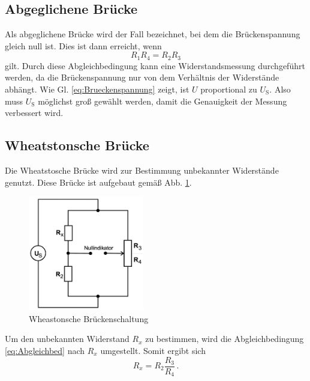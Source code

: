     \subsection{Abgeglichene Brücke}
    Als abgeglichene Brücke wird der Fall bezeichnet, bei dem die Brückenspannung gleich null ist.
    Dies ist dann erreicht, wenn
    \begin{equation}
        R_1 R_4 = R_2 R_3
        \label{eq:Abgleichbed}
    \end{equation}
    gilt.
    Durch diese Abgleichbedingung kann eine Widerstandsmessung durchgeführt werden, da die Brückenspannung
    nur von dem Verhältnis der Widerstände abhängt.
    Wie Gl. \eqref{eq:Brueckenspannung} zeigt, ist $U$ proportional zu $U_{\text{S}}$.
    Also muss $U_{\text{S}}$ möglichst groß gewählt werden, damit die Genauigkeit der Messung verbessert wird.
    \subsection{Wheatstonsche Brücke}
    Die Wheatstosche Brücke wird zur Bestimmung unbekannter Widerstände genutzt.
    Diese Brücke ist aufgebaut gemäß Abb. \ref{fig:Wheastonsche_Bruecke}.
    \begin{figure}
        \centering
        \includegraphics[height= 5cm]{Messdaten/Wheastonsche-Brueke.jpg}
        \caption{Wheastonsche Brückenschaltung}
        \label{fig:Wheastonsche_Bruecke}
    \end{figure}
    Um den unbekannten Widerstand $R_x$ zu bestimmen, wird die Abgleichbedingung \eqref{eq:Abgleichbed} nach $R_x$ umgestellt.
    Somit ergibt sich
    \begin{equation*}
        R_x = R_2 \frac{R_3}{R_4} \, \text{.}
    \end{equation*}
